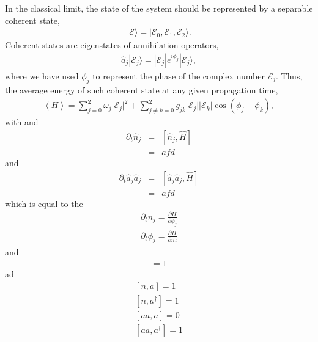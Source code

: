 \documentclass[9pt,twocolumn,twoside]{osajnl}
\begin{document}
In the classical limit, the state of the system should be represented by a separable coherent state,
\begin{eqnarray}
\vert \mathcal{E} \rangle = \vert \mathcal{E}_{0}, \mathcal{E}_{1}, \mathcal{E}_{2}  \rangle.
\end{eqnarray} 
Coherent states are eigenstates of annihilation operators,  
\begin{eqnarray}
	\hat{a}_j | \mathcal{E}_{j} \rangle= |\mathcal{E}_j| e^{i \phi_{j}} | \mathcal{E}_{j}\rangle ,
\end{eqnarray}
where  we have used $\phi_{j}$ to represent the phase of the complex number $\mathcal{E}_{j}$.
Thus, the average energy of such coherent state at any given propagation time,
\begin{eqnarray}
	\left\langle H \right\rangle = \sum_{j=0}^{2} \omega_{j} \vert \mathcal{E}_{j} \vert^2 
	+ \sum_{j \neq k = 0}^{2} g_{jk} \vert \mathcal{E}_{j} \vert  \vert \mathcal{E}_{k} \vert \cos \left( \phi_{j} - \phi_{k} \right),
\end{eqnarray}
with
and 
\begin{eqnarray}
 \partial_t \hat{n}_j &=& [\hat{n}_j,\hat{H}]\\
 &=& afd
\end{eqnarray}
and
\begin{eqnarray}
\partial_t \hat{a}_j \hat{a}_j &=& [\hat{a}_j \hat{a}_j,\hat{H}]\\
&=& afd
\end{eqnarray}
which is equal to the 
\begin{eqnarray}
\partial_t n_j = \frac{\partial H}{\partial \phi_j}\\
\partial_t \phi_j = \frac{\partial H}{\partial n_j}  
\end{eqnarray}
and
\begin{eqnarray}
	[a^{\dagger}, a] = 1	
\end{eqnarray}
ad
\begin{eqnarray}
	{}[n, a] = 1 \\
	{}[n, a^{\dagger}] = 1 \\
	{}[aa, a] = 0 \\
	{}[aa, a^{\dagger}] = 1 
\end{eqnarray}
\end{document}
